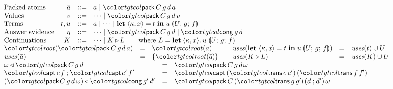 \begin{figure}[t]
\footnotesize
\color{tgtcol}
\[
\begin{array}{@{}l@{}}
\begin{array}{@{}l@{\quad}rcl@{}}
\text{Packed atoms} & \bar{a} & ::= & a \mid \ev{pack}\,C\,g\,d\,a \\
\text{Values} & v & ::= & \cdots \mid \ev{pack}\,C\,g\,d\,v \\
\text{Terms} & t, u & ::= & \bar{a} \mid \cdots \mid \letex{\kappa}{x}{t}{u}{U}{g}{f} \\
\text{Answer evidence} & \eta & ::= & \cdots \mid \ev{pack}\,C\,g\,d \mid \ev{cong}\,g\,d \\
\text{Continuations} & K & ::= & \cdots \mid K \triangleright L \qquad \text{where } L = \frletex{\kappa}{x}{u}{U}{g}{f}
\end{array} \\[6pt]
\begin{array}{@{}lcl@{\qquad}lcl@{}}
\rt{\ev{pack}\,C\,g\,d\,a} & = & \rt{a} & \uses{\letex{\kappa}{x}{t}{u}{U}{g}{f}} & = & \uses{t} \cup U \\
\uses{\bar{a}} & = & \cset{\rt{\bar{a}}} & \uses{K \triangleright L} & = & \uses{K} \cup U
\end{array} \\[3pt]
\begin{array}{@{}lcl@{}}
\appE{\omega}{\ev{pack}\,C\,g\,d} & = & \ev{pack}\,C\,g\,d\,\omega \\
\ev{capt}\,e\,f \mathbin{;} \ev{capt}\,e'\,f' & = & \ev{capt}\,(\ev{trans}\,e\,e')\,(\ev{trans}\,f\,f') \\
\appE{(\ev{pack}\,C\,g\,d\,\omega)}{\ev{cong}\,g'\,d'} & = & \ev{pack}\,C\,(\ev{trans}\,g\,g')\,(d \mathbin{;} d')\,\omega
\end{array}
\end{array}
\]
\end{figure}
